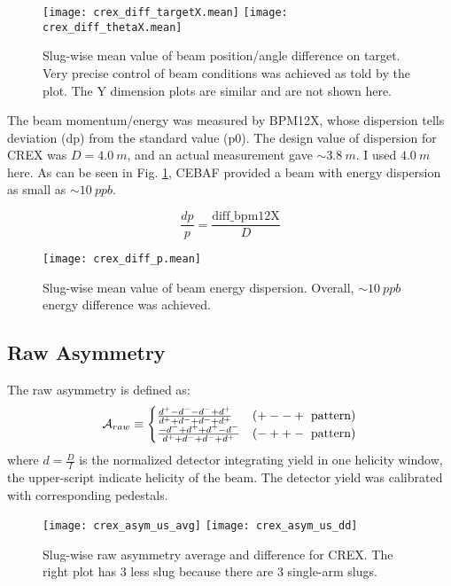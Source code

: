 \begin{figure}[H]
    \centering
    \texttt{[image: crex\_diff\_targetX.mean]}
    \texttt{[image: crex\_diff\_thetaX.mean]}
    \caption{Slug-wise mean value of beam position/angle difference on target. 
    Very precise control of beam conditions was achieved as told by the plot.
    The Y dimension plots are similar and are not shown here.}
\end{figure}


The beam momentum/energy was measured by BPM12X, whose dispersion tells deviation
(dp) from the standard value (p0). The design value of dispersion for CREX was
$D = 4.0\ m$, and an actual measurement gave $\sim3.8\ m$. I used $4.0\ m$ here.
As can be seen in Fig. \ref{fig:crex_diff_p}, CEBAF provided a beam with energy 
dispersion as small as $\sim10\ ppb$.

\begin{equation}
    \frac{dp}{p} = \frac{\text{diff\_bpm12X}}{D}
\end{equation}

\begin{figure}[H]
    \centering
    \texttt{[image: crex\_diff\_p.mean]}
    \caption{Slug-wise mean value of beam energy dispersion. Overall, $\sim 10\ ppb$ 
    energy difference was achieved. }
    \label{fig:crex_diff_p}
\end{figure}

\subsection{Raw Asymmetry}
The raw asymmetry is defined as:
\begin{equation}
    \CA_{raw} \equiv 
    \begin{cases}
	\frac{d^+ - d^- - d^- + d^+}{d^+ + d^- + d^- + d^+}	& (+--+\ \text{pattern})    \\
	\frac{-d^- + d^+ + d^+ - d^-}{d^+ + d^- + d^- + d^+}	& (-++-\ \text{pattern})    \\
    \end{cases}
\end{equation}
where $d=\frac{D}{I}$ is the normalized detector integrating yield in one helicity
window, the upper-script indicate helicity of the beam. The detector yield was
calibrated with corresponding pedestals. 
\begin{figure}[H]
    \centering
    \texttt{[image: crex\_asym\_us\_avg]}
    \texttt{[image: crex\_asym\_us\_dd]}
    \caption{Slug-wise raw asymmetry average and difference for CREX. The right plot
    has 3 less slug because there are 3 single-arm slugs.}
\end{figure}

